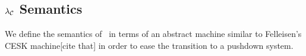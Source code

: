 \documentclass{sigplanconf}
\begin{document}
\newcommand{\A}[3]{\mathcal{A}(#1,#2,#3)}

\newcommand{\dynbla}[1]{\mathrm{dynamic\mhyphen blame}(#1)}

\newcommand{\ks}[0]{\kappa s}
\newcommand{\vv}[0]{\mathbf{v}}
\newcommand{\vvp}[0]{\mathbf{v'}}
\newcommand{\sexp}[4]{\Sigma_e(#1,#2,#3,#4)}
\newcommand{\sval}[3]{\Sigma_v(#1,#2,#3)}
\newcommand{\sapp}[4]{\Sigma_a(#1,#2,#3,#4)}
\newcommand{\scha}[6]{\Sigma_d(#1,#2,#3,#4,#5,#6)}
\newcommand{\sdchaz}[6]{\Sigma_{chap_0}(#1,#2,#3,#4,#5,#6)}
\newcommand{\sdchao}[5]{\Sigma_{chap_1}(#1,#2,#3,#4,#5)}
\newcommand{\serr}[0]{\mathrm{error}}
\newcommand{\sbla}[2]{\mathrm{blame}_{#1}(#2)}
\newcommand{\app}[4]{\mathrm{apply}(#1,#2,#3,#4)}
\newcommand{\red}[2]{\begin{align*}& #1\\\rr\, & #2\end{align*}}

\newcommand{\bind}[4]{\mathrm{bind}(#1,#2,#3,#4)}
\newcommand{\prebind}[2]{\mathrm{pre\mhyphen bind}(#1,#2)}
\newcommand{\recbind}[4]{\mathrm{rec\mhyphen bind}(#1,#2,#3,#4)}

\newcommand{\clo}[2]{(#1,#2)}
\newcommand{\cha}[2]{\mathrm{chaperone}(\ell,#1,#2)}
\newcommand{\imp}[2]{\mathrm{impersonator}(#1,#2)}

\newcommand{\chak}[1]{\mathrm{chap}_\kappa(\ell,#1)}
\newcommand{\chacwk}[2]{\mathrm{chap\mhyphen neg\mhyphen ults}_\kappa(\ell,#1,#2)}
\newcommand{\chacfk}[1]{\mathrm{chap\mhyphen fun\mhyphen ults}_\kappa(\ell,#1)}
\newcommand{\chacrk}[1]{\mathrm{chap\mhyphen pos\mhyphen ults}_\kappa(\ell,#1)}

\newcommand{\impk}[1]{\mathrm{imp}_\kappa(\ell,#1)}
\newcommand{\impcwk}[2]{\mathrm{imp\mhyphen neg\mhyphen ults}_\kappa(\ell,#1,#2)}
\newcommand{\impcfk}[1]{\mathrm{imp\mhyphen fun\mhyphen ults}_\kappa(\ell,#1)}
\newcommand{\impcrk}[1]{\mathrm{imp\mhyphen pos\mhyphen ults}_\kappa(\ell,#1)}


\newcommand{\letk}[3]{\mathrm{let}_\kappa(#1,#2,#3)}
\newcommand{\letreck}[3]{\mathrm{letrec}_\kappa(#1,#2,#3)}


\newcommand{\rr}{\longrightarrow}
\newcommand{\rrs}{\longrightarrow^{*}}

\subsection{$\lambda_{\mathcal{C}}$ Semantics}

We define the semantics of \chapcalc\ in terms of an abstract machine similar to Felleisen's CESK machine[cite that] in order to ease the transition to a pushdown system.
\end{document}

